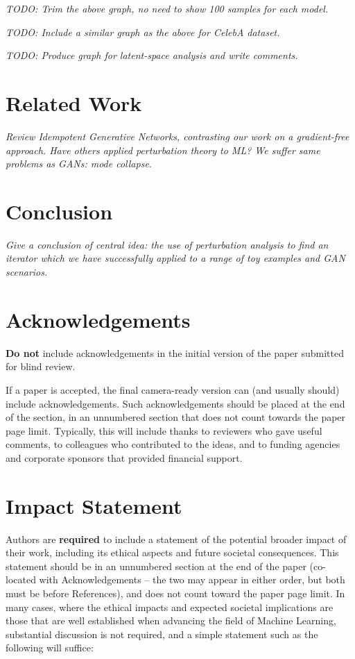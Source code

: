 \documentclass{article}
\theoremstyle{plain}
\theoremstyle{definition}
\theoremstyle{remark}
\begin{document}
\textit{TODO: Trim the above graph, no need to show 100 samples for each model.}

\textit{TODO: Include a similar graph as the above for CelebA dataset.}

\textit{TODO: Produce graph for latent-space analysis and write comments.}


\section{Related Work}
\label{sec:related}
\textit{Review Idempotent Generative Networks, contrasting our work on a gradient-free approach. Have others applied perturbation theory to ML? We suffer same problems as GANs: mode collapse.}

\section{Conclusion}
\label{sec:conclusion}
\textit{Give a conclusion of central idea: the use of perturbation analysis to find an iterator which we have successfully applied to a range of toy examples and GAN scenarios.}

\section*{Acknowledgements}

\textbf{Do not} include acknowledgements in the initial version of
the paper submitted for blind review.

If a paper is accepted, the final camera-ready version can (and
usually should) include acknowledgements.  Such acknowledgements
should be placed at the end of the section, in an unnumbered section
that does not count towards the paper page limit. Typically, this will
include thanks to reviewers who gave useful comments, to colleagues
who contributed to the ideas, and to funding agencies and corporate
sponsors that provided financial support.

\section*{Impact Statement}

Authors are \textbf{required} to include a statement of the potential
broader impact of their work, including its ethical aspects and future
societal consequences. This statement should be in an unnumbered
section at the end of the paper (co-located with Acknowledgements --
the two may appear in either order, but both must be before References),
and does not count toward the paper page limit. In many cases, where
the ethical impacts and expected societal implications are those that
are well established when advancing the field of Machine Learning,
substantial discussion is not required, and a simple statement such
as the following will suffice:
\end{document}
